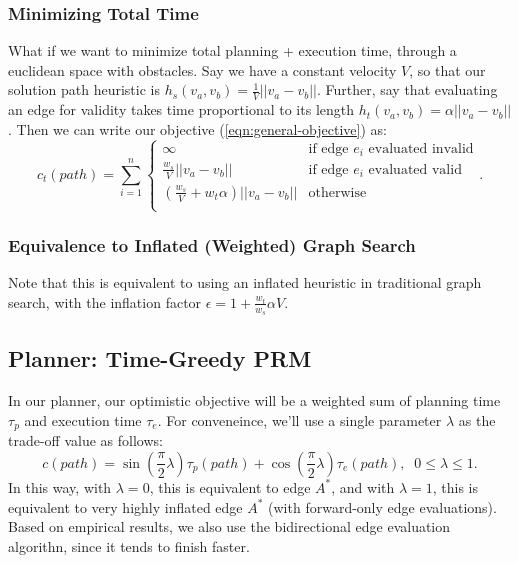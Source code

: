 \documentclass{article}
\begin{document}
\subsubsection{Minimizing Total Time}

What if we want to minimize total planning + execution time,
through a euclidean space with obstacles.
Say we have a constant velocity $V$,
so that our solution path heuristic is
$h_s(v_a, v_b) = \frac{1}{V} ||v_a -v_b||$.
Further, say that evaluating an edge for validity
takes time proportional to its length
$h_t(v_a, v_b) = \alpha ||v_a -v_b||$.
Then we can write our objective (\ref{eqn:general-objective})
as:
\begin{equation}
   c_t(path) = \sum_{i=1}^n \left\{
   \begin{array}{cl}
      \infty & \mbox{if edge } e_i \mbox{ evaluated invalid} \\
      \frac{w_s}{V} ||v_a -v_b|| & \mbox{if edge } e_i \mbox{ evaluated valid} \\
      (\frac{w_s}{V} + w_t \alpha) ||v_a -v_b|| & \mbox{otherwise} \\
   \end{array}
   \right.
   .
\end{equation}

\subsubsection{Equivalence to Inflated (Weighted) Graph Search}

Note that this is equivalent to using an inflated heuristic in traditional
graph search,
with the inflation factor $\epsilon = 1 + \frac{w_t}{w_s} \alpha V$.

\subsection{Planner: Time-Greedy PRM}

In our planner,
our optimistic objective will be a weighted sum of planning time $\tau_p$
and execution time $\tau_e$.
For conveneince,
we'll use a single parameter $\lambda$ as the trade-off value as follows:
\begin{equation}
   c(path) = \sin \left( \textstyle\frac{\pi}{2} \lambda \right) \tau_p(path)
   + \cos \left( \textstyle\frac{\pi}{2} \lambda \right) \tau_e(path),
   \;\; 0 \leq \lambda \leq 1.
\end{equation}
In this way,
with $\lambda = 0$, this is equivalent to edge $A^*$,
and with $\lambda = 1$, this is equivalent to very highly inflated edge $A^*$
(with forward-only edge evaluations).
Based on empirical results, we also use the bidirectional edge evaluation
algorithn,
since it tends to finish faster.
\end{document}
